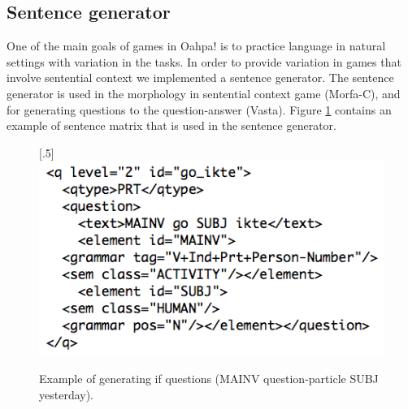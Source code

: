 \documentclass[11pt]{article}
\begin{document}



\subsection{Sentence generator}\label{set}

One of the main goals of games in Oahpa! is to practice language in natural settings with variation in the tasks. In order to provide variation in games that involve sentential context we implemented a sentence generator. The sentence generator is used in the morphology in sentential context game (Morfa-C), and for generating questions to the question-answer (Vasta). Figure \ref{questionv} contains an example of sentence matrix that is used in the sentence generator.

\begin{figure}[htbp]
\begin{center}
\scalebox{.5}[.5]{\includegraphics{presentation/img/question_vasta2.png}}\\
\caption{Example of generating if questions (MAINV question-particle SUBJ yesterday).}
\label{questionv}
\end{center}
\end{figure}
\end{document}
